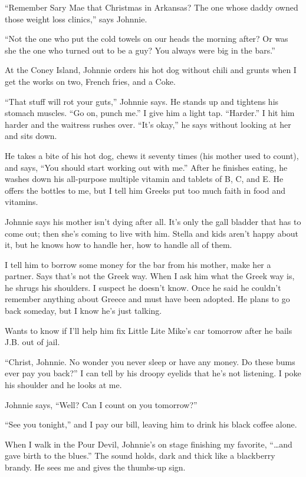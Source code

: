 \documentclass[twoside,10pt]{book}
\begin{document}
``Remember Sary Mae that Christmas in Arkansas? The one whose daddy
owned those weight loss clinics,'' says Johnnie.

``Not the one who put the cold towels on our heads the morning after? Or
was she the one who turned out to be a guy? You always were big in the
bars.''

At the Coney Island, Johnnie orders his hot dog without chili and grunts
when I get the works on two, French fries, and a Coke.

``That stuff will rot your guts,'' Johnnie says. He stands up and
tightens his stomach muscles. ``Go on, punch me.'' I give him a light
tap. ``Harder.'' I hit him harder and the waitress rushes over. ``It's
okay,'' he says without looking at her and sits down.

He takes a bite of his hot dog, chews it seventy times (his mother used
to count), and says, ``You should start working out with me.'' After he
finishes eating, he washes down his all-purpose multi­ple vitamin and
tablets of B, C, and E. He offers the bottles to me, but I tell him
Greeks put too much faith in food and vitamins.

Johnnie says his mother isn't dying after all. It's only the gall
bladder that has to come out; then she's coming to live with him. Stella
and kids aren't happy about it, but he knows how to handle her, how to
handle all of them.

I tell him to borrow some money for the bar from his mother, make her a
partner. Says that's not the Greek way. When I ask him what the Greek
way is, he shrugs his shoulders. I suspect he doesn't know. Once he said
he couldn't remember anything about Greece and must have been adopted.
He plans to go back someday, but I know he's just talking.

Wants to know if I'll help him fix Little Lite Mike's car tomorrow after
he bails J.B. out of jail.

``Christ, Johnnie. No wonder you never sleep or have any money. Do these
bums ever pay you back?'' I can tell by his droopy eyelids that he's not
listening. I poke his shoulder and he looks at me.

Johnnie says, ``Well? Can I count on you tomorrow?''

``See you tonight,'' and I pay our bill, leaving him to drink his black
coffee alone.

When I walk in the Pour Devil, Johnnie's on stage finishing my favorite,
``\ldots and gave birth to the blues.'' The sound holds, dark and thick
like a blackberry brandy. He sees me and gives the thumbs-up sign.
\end{document}
